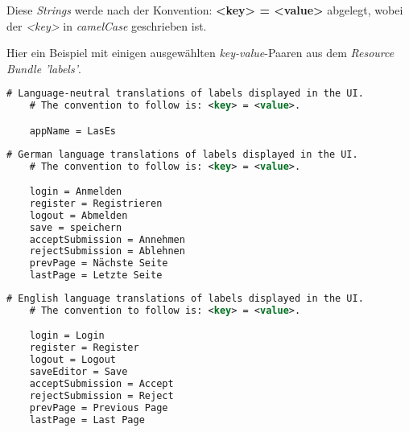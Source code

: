 Diese \emph{Strings} werde nach der Konvention:
\textbf{<key> = <value>}
abgelegt, wobei der \emph{<key>} in \emph{camelCase} geschrieben ist.

Hier ein Beispiel mit einigen ausgewählten \emph{key-value}-Paaren aus
dem \emph{Resource Bundle 'labels'}.
\begin{lstlisting}[language=XML, caption = Beispielhafter Ausschnitt aus \emph{labels.properties}]
    # Language-neutral translations of labels displayed in the UI.
    # The convention to follow is: <key> = <value>.

    appName = LasEs
\end{lstlisting}
\begin{lstlisting}[language=XML, caption = Beispielhafter Ausschnitt aus \emph{labels\_de.properties}]
    # German language translations of labels displayed in the UI.
    # The convention to follow is: <key> = <value>.

    login = Anmelden
    register = Registrieren
    logout = Abmelden
    save = speichern
    acceptSubmission = Annehmen
    rejectSubmission = Ablehnen
    prevPage = Nächste Seite
    lastPage = Letzte Seite
\end{lstlisting}

\begin{lstlisting}[language=XML, caption = Beispielhafter Ausschnitt aus \emph{labels\_en.properties}]
    # English language translations of labels displayed in the UI.
    # The convention to follow is: <key> = <value>.

    login = Login
    register = Register
    logout = Logout
    saveEditor = Save
    acceptSubmission = Accept
    rejectSubmission = Reject
    prevPage = Previous Page
    lastPage = Last Page
\end{lstlisting}